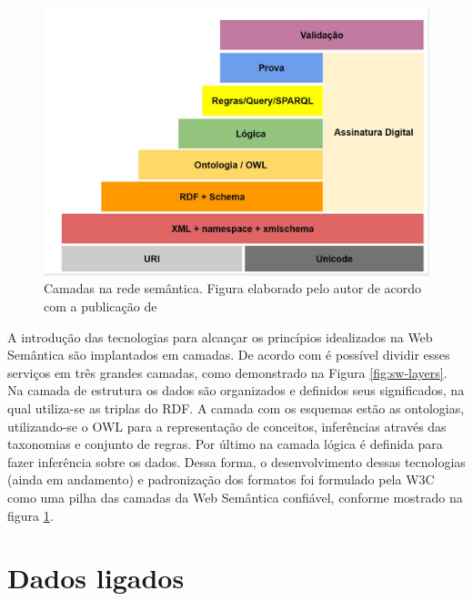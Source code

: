 \begin{figure}
	\centering
	\includegraphics[scale=0.30]{imagens/sw_w3c_stack.jpg}
	\caption{Camadas na rede semântica. Figura elaborado pelo autor de acordo com a publicação de \cite{SemanticWebStack}}
	\label{fig:sw-w3c-stack}
\end{figure}

A introdução das tecnologias para alcançar os princípios idealizados na Web Semântica são implantados em camadas. De acordo com \cite{bernerslee2001semantic} é possível dividir esses serviços em três grandes camadas, como demonstrado na Figura \ref{fig:sw-layers}. Na camada de estrutura os dados são organizados e definidos seus significados, na qual utiliza-se as triplas do RDF. A camada com os esquemas estão as ontologias, utilizando-se o OWL para a representação de conceitos, inferências através das taxonomias e conjunto de regras. Por último na camada lógica é definida para fazer inferência sobre os dados. Dessa forma, o desenvolvimento dessas tecnologias (ainda em andamento) e padronização dos formatos foi formulado pela W3C como uma pilha das camadas \citep{SemanticWebStack} da Web Semântica confiável, conforme mostrado na figura \ref{fig:sw-w3c-stack}.

\section{Dados ligados}

